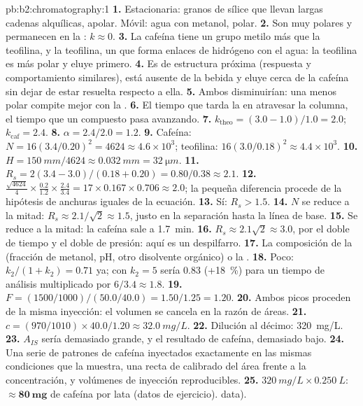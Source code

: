 \begin{solution}{pb:b2:chromatography:1}
\textbf{1.} Estacionaria: granos de sílice que llevan largas cadenas alquílicas, apolar. Móvil: agua con
metanol, polar.
\textbf{2.} Son muy polares y permanecen en la : $k \approx 0$.
\textbf{3.} La cafeína tiene un grupo metilo más que la teofilina, y la teofilina, un  que
forma enlaces de hidrógeno con el agua: la teofilina es más polar y eluye primero.
\textbf{4.} Es de estructura próxima (respuesta y comportamiento similares), está ausente de la bebida y eluye
cerca de la cafeína sin dejar de estar resuelta respecto a ella.
\textbf{5.} Ambos disminuirían: una  menos polar compite mejor con la .
\textbf{6.} El tiempo que tarda la  en atravesar la columna, el tiempo que un compuesto pasa avanzando.
\textbf{7.} $k_{\mathrm{theo}} = (3.0 - 1.0)/1.0 = 2.0$; $k_{\mathrm{caf}} = 2.4$.
\textbf{8.} $\alpha = 2.4/2.0 = 1.2$.
\textbf{9.} Cafeína: $N = 16(3.4/0.20)^2 = 4624 \approx 4.6 \times 10^3$; teofilina: $16(3.0/0.18)^2
\approx 4.4 \times 10^3$.
\textbf{10.} $H = \qty{150}{mm}/4624 \approx \qty{0.032}{mm} = \qty{32}{\micro m}$.
\textbf{11.} $R_s = 2(3.4 - 3.0)/(0.18 + 0.20) = 0.80/0.38 \approx 2.1$.
\textbf{12.} $\frac{\sqrt{4624}}{4} \times \frac{0.2}{1.2} \times \frac{2.4}{3.4} = 17 \times 0.167 \times
0.706 \approx 2.0$; la pequeña diferencia procede de la hipótesis de anchuras iguales de la ecuación.
\textbf{13.} Sí: $R_s > 1.5$.
\textbf{14.} $N$ se reduce a la mitad: $R_s \approx 2.1/\sqrt2 \approx 1.5$, justo en la separación hasta la línea de base.
\textbf{15.} Se reduce a la mitad: la cafeína sale a \qty{1.7}{min}.
\textbf{16.} $R_s \approx 2.1\sqrt2 \approx 3.0$, por el doble de tiempo y el doble de presión: aquí es un despilfarro.
\textbf{17.} La composición de la  (fracción de metanol, pH, otro disolvente orgánico) o la
.
\textbf{18.} Poco: $k_2/(1 + k_2) = 0.71$ ya; con $k_2 = 5$ sería 0.83 (+18~\%) para un
tiempo de análisis multiplicado por $6/3.4 \approx 1.8$.
\textbf{19.} $F = (1500/1000)/(50.0/40.0) = 1.50/1.25 = 1.20$.
\textbf{20.} Ambos picos proceden de la misma inyección: el volumen se cancela en la razón de áreas.
\textbf{21.} $c = (970/1010) \times 40.0/1.20 \approx \qty{32.0}{mg/L}$.
\textbf{22.} Dilución al décimo: \qty{320}{mg/L}.
\textbf{23.} $A_{IS}$ sería demasiado grande, y el resultado de cafeína, demasiado bajo.
\textbf{24.} Una serie de patrones de cafeína inyectados exactamente en las mismas condiciones que la muestra, una
recta de calibrado del área frente a la concentración, y volúmenes de inyección reproducibles.
\textbf{25.} $\qty{320}{mg/L} \times \qty{0.250}{L}$: $\boldsymbol{\approx \qty{80}{mg}}$ de cafeína por lata (datos
de ejercicio).
data).
\end{solution}
